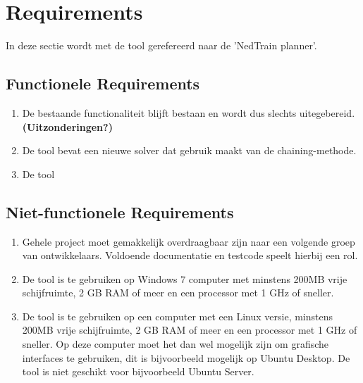 \section{Requirements}
In deze sectie wordt met de tool gerefereerd naar de 'NedTrain planner'.

\subsection{Functionele Requirements}
\begin{enumerate}
    \item De bestaande functionaliteit blijft bestaan en wordt dus slechts uitegebereid. \textbf{(Uitzonderingen?)}
    \item De tool bevat een nieuwe solver dat gebruik maakt van de chaining-methode. 
    \item De tool
\end{enumerate}

\subsection{Niet-functionele Requirements}
\begin{enumerate}
    \item Gehele project moet gemakkelijk overdraagbaar zijn naar een volgende groep van ontwikkelaars. Voldoende documentatie en testcode speelt hierbij een rol.
    \item De tool is te gebruiken op Windows 7 computer met minstens 200MB vrije schijfruimte, 2 GB RAM of meer en een processor met 1 GHz of sneller.
    \item De tool is te gebruiken op een computer met een Linux versie, minstens 200MB vrije schijfruimte, 2 GB RAM of meer en een processor met 1 GHz of sneller. Op deze computer moet het dan wel mogelijk zijn om grafische interfaces te gebruiken, dit is bijvoorbeeld mogelijk op Ubuntu Desktop. De tool is niet geschikt voor bijvoorbeeld Ubuntu Server. 
\end{enumerate}
